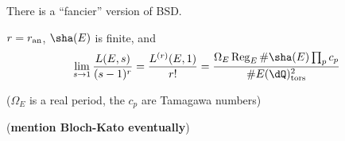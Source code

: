 \documentclass{article}
\begin{document}
There is a ``fancier'' version of BSD. 

\begin{conjecture}[BSD]
$r=r_\textnormal{an}$, $\sha(E)$ is finite, and 
\[
  \lim_{s\to 1} \frac{L(E,s)}{(s-1)^r} = \frac{L^{(r)}(E,1)}{r!} = \frac{\Omega_E \operatorname{Reg}_E \# \sha(E) \prod_p c_p}{\# E(\dQ)_\textnormal{tors}^2}
\]
\end{conjecture}

($\Omega_E$ is a real period, the $c_p$ are Tamagawa numbers)

(\textbf{mention Bloch-Kato eventually})







\end{document}
